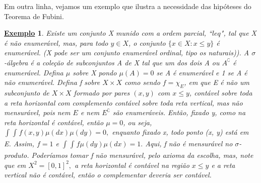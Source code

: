 \documentclass{article}
\newtheorem{example}{\underline{Exemplo}}
\begin{document}
  Em outra linha, vejamos um exemplo que ilustra a necessidade das hipóteses do Teorema de Fubini. 
 \begin{example}
   Existe um conjunto X munido com a ordem parcial, ``\(leq \)", tal que X é não enumerável, mas, para todo \(y\in X\), o conjunto \(\{x\in X: x \leq y\}\) é enumerável. (X pode ser um conjunto enumerável ordinal, tipo os naturais)). 
   A \(\sigma \)-álgebra é a coleção de subconjuntos A de X tal que um dos dois A ou \(A ^{\complement}\) é enumerável. Defina \(\mu \) sobre X pondo \(\mu (A) = 0\) se A é enumerável e 1 se A é não enumerável. Defina f sobre \(X\times X\) como sendo 
   \(f = \chi_{E}\), em que E é não um subconjunto de \(X\times X\) formado por pares \((x, y)\) com \(x\leq y\), contável sobre toda a reta horizontal com complemento contável sobre toda reta vertical, mas não mensurável, pois nem \(E \) e nem \(E ^{\complement}\) são enumeráveis. 
   Então, fixado y, como na reta horizontal é contável, então \(\mu = 0\), ou seja, \(\int_{}^{}\int_{}^{}f(x, y)\mu (dx)\mu (dy) = 0, \) enquanto fixado x, todo ponto (x, y) está em E. Assim, \(f=1\) e \(\int_{}^{}\int_{}^{}f\mu (dy)\mu (dx) = 1.\)
   Aqui, f não é mensurável no \(\sigma \)-produto. Poderíamos tomar f não mensurável, pelo axioma da escolha, mas, note que em \(X^{2} = [0, 1]^{2},\) a reta horizontal é contável na região \(x\leq y\) e a reta vertical não é contável, então o complementar deveria ser contável.
 \end{example}
\end{document}
